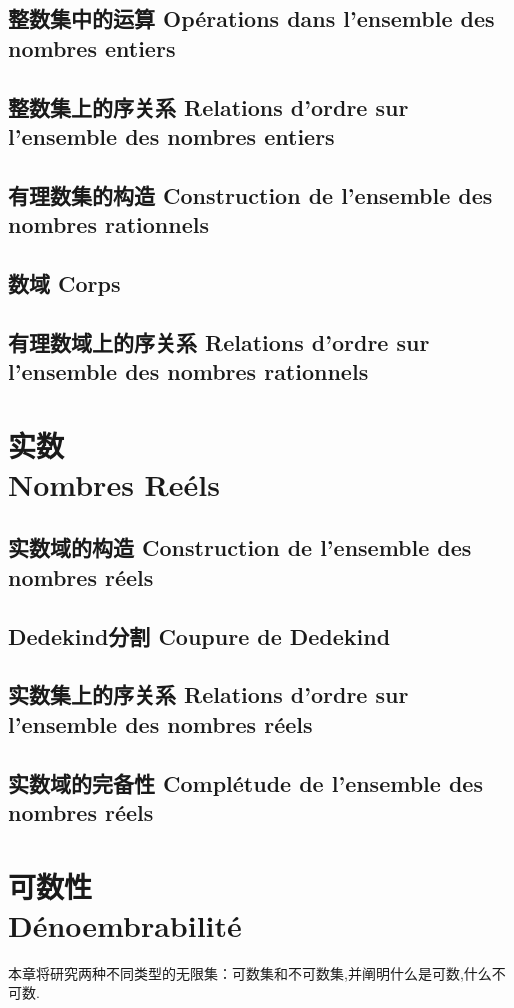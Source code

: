 \documentclass[12pt, a4paper, oneside]{ctexbook}
\begin{document}
  \section{整数集中的运算 Opérations dans l'ensemble des nombres entiers}
  \section{整数集上的序关系 Relations d'ordre sur l'ensemble des nombres entiers}
  \section{有理数集的构造 Construction de l'ensemble des nombres rationnels}
  \section{数域 Corps}
  \section{有理数域上的序关系 Relations d'ordre sur l'ensemble des nombres rationnels}



\chapter{实数\\ Nombres Reéls}%
  \section{实数域的构造 Construction de l'ensemble des nombres réels}
  \section{Dedekind分割 Coupure de Dedekind}
  \section{实数集上的序关系 Relations d'ordre sur l'ensemble des nombres réels}
  \section{实数域的完备性 Complétude de l'ensemble des nombres réels}


\chapter{可数性\\ Dénoembrabilité}
  本章将研究两种不同类型的无限集：可数集和不可数集,并阐明什么是可数,什么不可数.
\end{document}

